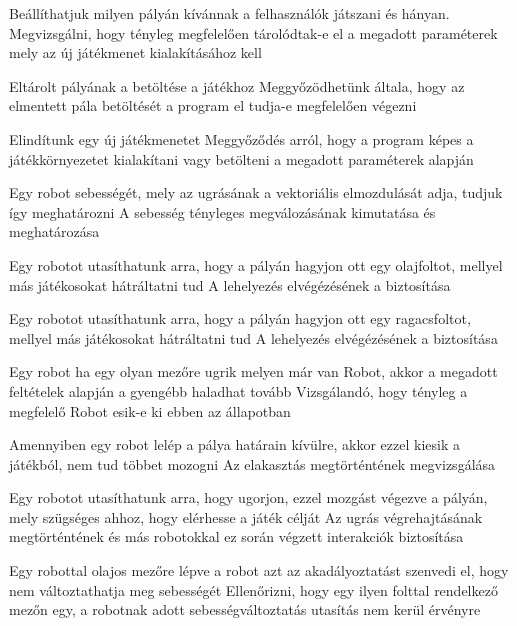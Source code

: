 %
{Beállíthatjuk milyen pályán kívánnak a felhasználók játszani és hányan.}%
{Megvizsgálni, hogy tényleg megfelelően tárolódtak-e el a megadott paraméterek mely az új játékmenet kialakításához kell}

%
{Eltárolt pályának a betöltése a játékhoz}%
{Meggyőzödhetünk általa, hogy az elmentett pála betöltését a program el tudja-e megfelelően végezni}

%
{Elindítunk egy új játékmenetet}%
{Meggyőződés arról, hogy a program képes a játékkörnyezetet kialakítani vagy betölteni a megadott paraméterek alapján}

%
{Egy robot sebességét, mely az ugrásának a vektoriális elmozdulását adja, tudjuk így meghatározni}%
{A sebesség tényleges megválozásának kimutatása és meghatározása}

%
{Egy robotot utasíthatunk arra, hogy a pályán hagyjon ott egy olajfoltot, mellyel más játékosokat hátráltatni tud}%
{A lehelyezés elvégézésének a biztosítása}

%
{Egy robotot utasíthatunk arra, hogy a pályán hagyjon ott egy ragacsfoltot, mellyel más játékosokat hátráltatni tud}%
{A lehelyezés elvégézésének a biztosítása}

%
{Egy robot ha egy olyan mezőre ugrik melyen már van Robot, akkor a megadott feltételek alapján a gyengébb haladhat tovább}%
{Vizsgálandó, hogy tényleg a megfelelő Robot esik-e ki ebben az állapotban}

%
{Amennyiben egy robot lelép a pálya határain kívülre, akkor ezzel kiesik a játékból, nem tud többet mozogni}%
{Az elakasztás megtörténtének megvizsgálása}

%
{Egy robotot utasíthatunk arra, hogy ugorjon, ezzel mozgást végezve a pályán, mely szügséges ahhoz, hogy elérhesse a játék célját}%
{Az ugrás végrehajtásának megtörténtének és más robotokkal ez során végzett interakciók biztosítása}

%
{Egy robottal olajos mezőre lépve a robot azt az akadályoztatást szenvedi el, hogy nem változtathatja meg sebességét}%
{Ellenőrizni, hogy egy ilyen folttal rendelkező mezőn egy, a robotnak adott sebességváltoztatás utasítás nem kerül érvényre}

